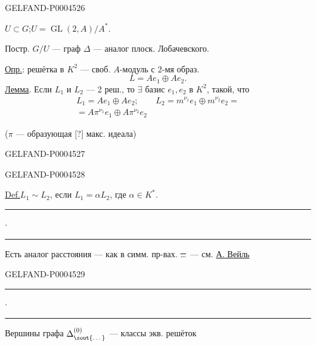 \begin{GelfandAdjacentEvidence}{GELFAND-P000452}{6}


$U\subset G$;\quad $U=\operatorname{GL}(2,A)/A^*$.

Постр. $G/U$ — граф $\Delta$ — аналог плоск. Лобачевского.

\underline{Опр.}: решётка в $K^2$ — своб. $A$-модуль с 2-мя образ.
\[
L=Ae_1\oplus Ae_2.
\]
\underline{Лемма}. Если $L_1$ и $L_2$ — 2 реш.,
то $\exists$ базис $e_1,e_2$ в $K^2$, такой, что
\[
\begin{gathered}
L_1=Ae_1\oplus Ae_2;\qquad L_2=m^{\nu_1}e_1\oplus m^{\nu_2}e_2=\\
{}=A\pi^{\nu_1}e_1\oplus A\pi^{\nu_2}e_2
\end{gathered}
\]

\hfill($\pi$ — образующая [?] макс. идеала)
\end{GelfandAdjacentEvidence}
\begin{GelfandAdjacentEvidence}{GELFAND-P000452}{7}


\end{GelfandAdjacentEvidence}
\begin{GelfandAdjacentEvidence}{GELFAND-P000452}{8}


\underline{Def.}\quad $L_1\sim L_2$, если
\underline{$L_1=\alpha L_2$}, где $\alpha\in K^*$.

\begin{center}
\rule[.5ex]{17mm}{.35pt}\enspace$\cdot$\enspace\rule[.5ex]{19mm}{.35pt}
\end{center}
Есть аналог расстояния — как в симм. пр-вах. \sout{\ldots}\ — см. \underline{А. Вейль}
\end{GelfandAdjacentEvidence}
\begin{GelfandAdjacentEvidence}{GELFAND-P000452}{9}


\begin{center}
\rule[.5ex]{17mm}{.35pt}\enspace$\cdot$\enspace\rule[.5ex]{19mm}{.35pt}
\end{center}
Вершины графа $\Delta^{(0)}_{\text{\sout{\ldots}}}$ — классы экв. решёток
\end{GelfandAdjacentEvidence}


